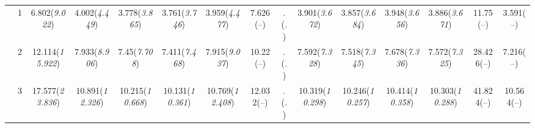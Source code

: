 \documentclass{article}
\begin{document}
\begin{table}[tbp]
{\begin{tabularx}{\textwidth}{lCCCCCCCCCCCCCC}
&1&6.802\newline (\emph{9.022})&4.002\newline (\emph{4.449})&3.778\newline (\emph{3.865})&3.761\newline (\emph{3.746})&3.959\newline (\emph{4.477})&7.626\newline (--)&.\newline (\emph{.})&3.901\newline (\emph{3.672})&3.857\newline (\emph{3.684})&3.948\newline (\emph{3.656})&3.886\newline (\emph{3.671})&11.75\newline (--)&3.591\newline (--) \tabularnewline
&2&12.114\newline (\emph{15.922})&7.933\newline (\emph{8.906})&7.45\newline (\emph{7.708})&7.411\newline (\emph{7.468})&7.915\newline (\emph{9.037})&10.22\newline (--)&.\newline (\emph{.})&7.592\newline (\emph{7.328})&7.518\newline (\emph{7.345})&7.678\newline (\emph{7.336})&7.572\newline (\emph{7.325})&28.426\newline (--)&7.216\newline (--) \tabularnewline
&3&17.577\newline (\emph{23.836})&10.891\newline (\emph{12.326})&10.215\newline (\emph{10.668})&10.131\newline (\emph{10.361})&10.769\newline (\emph{12.408})&12.032\newline (--)&.\newline (\emph{.})&10.319\newline (\emph{10.298})&10.246\newline (\emph{10.257})&10.414\newline (\emph{10.358})&10.303\newline (\emph{10.288})&41.824\newline (--)&10.564\newline (--) \tabularnewline

\end{tabularx}}
\end{table}
\end{document}
